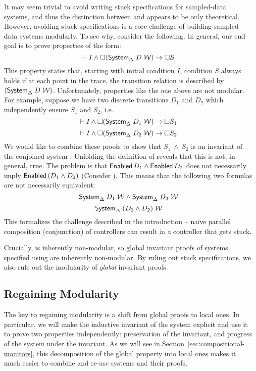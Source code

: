 It may seem trivial to avoid writing stuck specifications for sampled-data
systems, and thus the distinction between \SysA{} and \System appears to be
only theoretical.  However, avoiding stuck specifications is a core
challenge of building sampled-data systems modularly. To see why, consider
the following. In general, our end goal is to prove properties of the form:
\[
\vdash I \wedge \Box{} (\mathsf{System}_{\Delta}\;D\;\mathcal{W}) \rightarrow \Box{} S
\]
This property states that, starting with initial condition $I$, condition
$S$ always holds if at each point in the trace, the transition relation is
described by $(\mathsf{System}_{\Delta}\;D\;\mathcal{W})$.  Unfortunately, properties like
the one above are not modular.  For example, suppose we have two discrete
transitions $D_1$ and $D_2$ which independently ensure $S_1$ and $S_2$,
i.e.
\[
\vdash I \wedge \Box{} (\mathsf{System}_{\Delta}\;D_1\;\mathcal{W}) \rightarrow \Box{} S_1
\]
\[
\vdash I \wedge \Box{} (\mathsf{System}_{\Delta}\;D_2\;\mathcal{W}) \rightarrow \Box{} S_2
\]
We would like to combine these proofs to show that $S_1~\wedge~S_2$ is an
invariant of the conjoined system .
Unfolding the definition of \System reveals that this is not, in general,
true.  The problem is that $\textsf{Enabled}\, D_1 \wedge \textsf{Enabled}\, D_2$ does not
necessarily imply $\textsf{Enabled}\, (D_1 \wedge D_2)$ (Consider
).
This means that the following two formulas are not necessarily equivalent:
\[
\mathsf{System}_{\Delta}\;D_1\;\mathcal{W}\wedge\mathsf{System}_{\Delta}\;D_2\;\mathcal{W}
\]
\[
\mathsf{System}_{\Delta}\;(D_1 \wedge D_2)\;\mathcal{W}
\]
This formalizes the challenge described in the introduction -- na\"ive
parallel composition (conjunction) of controllers can result in a
controller that gets stuck.

Crucially, \Enabled is inherently non-modular, so global invariant proofs
of systems specified using \System are inherently non-modular. By ruling
out stuck specifications, we also rule out the modularity of \emph{global}
invariant proofs.

\subsection{Regaining Modularity}
The key to regaining modularity is a shift from global proofs to local
ones.  In particular, we will make the inductive invariant of the system
explicit and use it to prove two properties independently: preservation of
the invariant, and progress of the system under the invariant.  As we will
see in Section~\ref{sec:compositional-monitors}, this decomposition of the
global property into local ones makes it much easier to combine and re-use
systems and their proofs.

